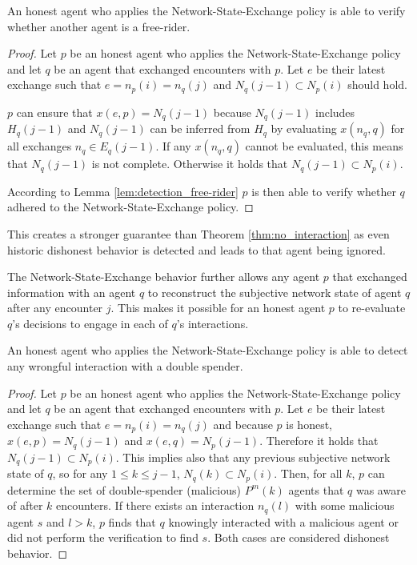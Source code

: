 \begin{thm}
    \label{thm:ver_free-rider}
    An honest agent who applies the Network-State-Exchange policy is able to verify whether another
    agent is a free-rider.
\end{thm}
\begin{proof}
    Let $p$ be an honest agent who applies the Network-State-Exchange policy and let $q$ be an agent
    that exchanged encounters with $p$. Let $e$ be their latest exchange such that $e = n_p(i) = n_q(j)$
    and $N_q(j-1) \subset N_p(i)$ should hold.
    
    $p$ can ensure that $x(e, p) = N_q(j-1)$ because $N_q(j-1)$ includes $H_q(j-1)$ and $N_q(j-1)$
    can be inferred from $H_q$ by evaluating $x(n_q, q)$ for all exchanges $n_q \in E_q(j-1)$.
    If any $x(n_q, q)$ cannot be evaluated, this means that $N_q(j-1)$ is not complete.
    Otherwise it holds that $N_q(j-1) \subset N_p(i)$. 

    According to Lemma \ref{lem:detection_free-rider} $p$ is then able to verify whether 
    $q$ adhered to the Network-State-Exchange policy.
\end{proof}

This creates a stronger guarantee than Theorem \ref{thm:no_interaction} as even historic dishonest
behavior is detected and leads to that agent being ignored.

The Network-State-Exchange behavior further allows any agent $p$ that exchanged information with an agent $q$
to reconstruct the subjective network state of agent $q$ after any encounter $j$. 
This makes it possible for an honest agent $p$ to re-evaluate $q$'s decisions to engage in each of $q$'s 
interactions.

\begin{thm}
    \label{thm:ver_free-rider}
    An honest agent who applies the Network-State-Exchange policy is able to detect any wrongful
    interaction with a double spender.
\end{thm}
\begin{proof}
    Let $p$ be an honest agent who applies the Network-State-Exchange policy and let $q$ be an agent
    that exchanged encounters with $p$. Let $e$ be their latest exchange such that $e = n_p(i) = n_q(j)$
    and because $p$ is honest, $x(e, p) = N_q(j-1)$ and $x(e,q) = N_p(j-1)$. 
    Therefore it holds that $N_q(j-1) \subset N_p(i)$. This implies also that any previous 
    subjective network state of $q$, so for any $1 \leq k \leq j-1$, $N_q(k) \subset N_p(i)$. Then,
    for all $k$, $p$ can determine the set of double-spender (malicious) $P^m(k)$ agents that $q$
    was aware of after $k$ encounters. If there exists an interaction $n_q(l)$ with some malicious
    agent $s$ and $l>k$, $p$ finds that $q$ knowingly interacted with a malicious agent or did not
    perform the verification to find $s$. Both cases are considered dishonest behavior.
\end{proof}

